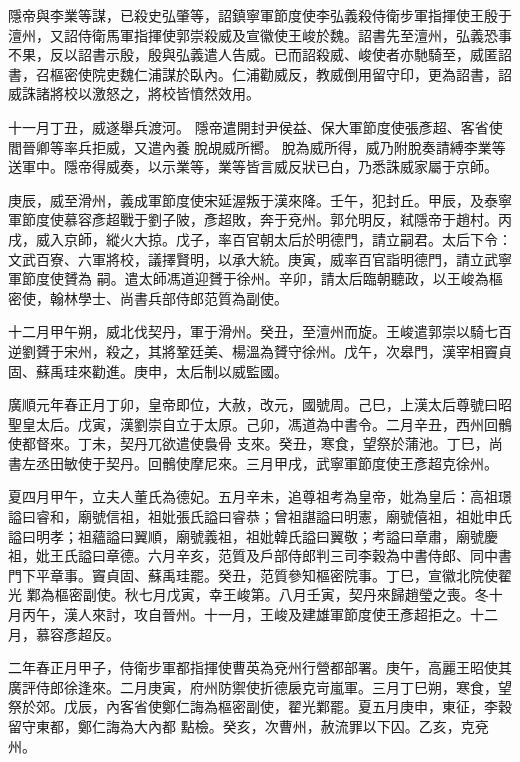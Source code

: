 \begin{pinyinscope}
 隱帝與李業等謀，已殺史弘肇等，詔鎮寧軍節度使李弘義殺侍衛步軍指揮使王殷于澶州，又詔侍衛馬軍指揮使郭崇殺威及宣徽使王峻於魏。詔書先至澶州，弘義恐事不果，反以詔書示殷，殷與弘義遣人告威。已而詔殺威、峻使者亦馳騎至，威匿詔書，召樞密使院吏魏仁浦謀於臥內。仁浦勸威反，教威倒用留守印，更為詔書，詔威誅諸將校以激怒之，將校皆憤然效用。



 十一月丁丑，威遂舉兵渡河。
 隱帝遣開封尹侯益、保大軍節度使張彥超、客省使閻晉卿等率兵拒威，又遣內養脫覘威所嚮。脫為威所得，威乃附脫奏請縛李業等送軍中。隱帝得威奏，以示業等，業等皆言威反狀已白，乃悉誅威家屬于京師。



 庚辰，威至滑州，義成軍節度使宋延渥叛于漢來降。壬午，犯封丘。甲辰，及泰寧軍節度使慕容彥超戰于劉子陂，彥超敗，奔于兗州。郭允明反，弒隱帝于趙村。丙戌，威入京師，縱火大掠。戊子，率百官朝太后於明德門，請立嗣君。太后下令：文武百寮、六軍將校，議擇賢明，以承大統。庚寅，威率百官詣明德門，請立武寧軍節度使贇為
 嗣。遣太師馮道迎贇于徐州。辛卯，請太后臨朝聽政，以王峻為樞密使，翰林學士、尚書兵部侍郎范質為副使。



 十二月甲午朔，威北伐契丹，軍于滑州。癸丑，至澶州而旋。王峻遣郭崇以騎七百逆劉贇于宋州，殺之，其將鞏廷美、楊溫為贇守徐州。戊午，次皋門，漢宰相竇貞固、蘇禹珪來勸進。庚申，太后制以威監國。



 廣順元年春正月丁卯，皇帝即位，大赦，改元，國號周。己巳，上漢太后尊號曰昭聖皇太后。戊寅，漢劉崇自立于太原。己卯，馮道為中書令。二月辛丑，西州回鶻使都督來。丁未，契丹兀欲遣使裊骨
 支來。癸丑，寒食，望祭於蒲池。丁巳，尚書左丞田敏使于契丹。回鶻使摩尼來。三月甲戌，武寧軍節度使王彥超克徐州。



 夏四月甲午，立夫人董氏為德妃。五月辛未，追尊祖考為皇帝，妣為皇后：高祖璟謚曰睿和，廟號信祖，祖妣張氏謚曰睿恭；曾祖諶謚曰明憲，廟號僖祖，祖妣申氏謚曰明孝；祖蘊謚曰翼順，廟號義祖，祖妣韓氏謚曰翼敬；考謚曰章肅，廟號慶祖，妣王氏謚曰章德。六月辛亥，范質及戶部侍郎判三司李穀為中書侍郎、同中書門下平章事。竇貞固、蘇禹珪罷。癸丑，范質參知樞密院事。丁巳，宣徽北院使翟光
 鄴為樞密副使。秋七月戊寅，幸王峻第。八月壬寅，契丹來歸趙瑩之喪。冬十月丙午，漢人來討，攻自晉州。十一月，王峻及建雄軍節度使王彥超拒之。十二月，慕容彥超反。



 二年春正月甲子，侍衛步軍都指揮使曹英為兗州行營都部署。庚午，高麗王昭使其廣評侍郎徐逢來。二月庚寅，府州防禦使折德扆克岢嵐軍。三月丁巳朔，寒食，望祭於郊。戊辰，內客省使鄭仁誨為樞密副使，翟光鄴罷。夏五月庚申，東征，李穀留守東都，鄭仁誨為大內都
 點檢。癸亥，次曹州，赦流罪以下囚。乙亥，克兗州。




\end{pinyinscope}

